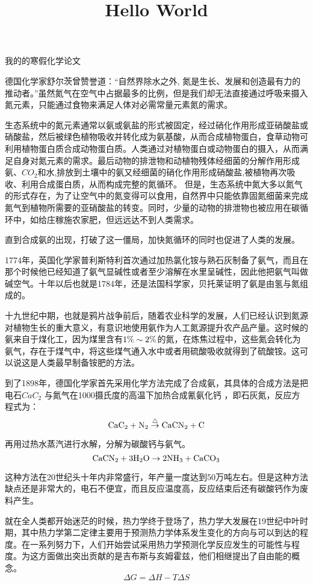 \documentclass{article}
\title{Hello World}
\begin{document}
  

我的的寒假化学论文

德国化学家舒尔茨曾赞誉道：“自然界除水之外, 氮是生长、发展和创造最有力的推动者。”虽然氮气在空气中占据最多的比例，但是我们却无法直接通过呼吸来摄入氮元素，只能通过食物来满足人体对必需常量元素氮的需求。

生态系统中的氮元素通常以氨或氨盐的形式被固定，经过硝化作用形成亚硝酸盐或硝酸盐，然后被绿色植物吸收并转化成为氨基酸，从而合成植物蛋白，食草动物可利用植物蛋白质合成动物蛋白质。人类通过对植物蛋白或动物蛋白的摄入，从而满足自身对氮元素的需求。最后动物的排泄物和动植物残体经细菌的分解作用形成氨、$CO_2$和水,排放到土壤中的氨又经细菌的硝化作用形成硝酸盐,被植物再次吸收、利用合成蛋白质，从而构成完整的氮循环。 但是，生态系统中氮大多以氮气的形式存在，为了让空气中的氮变得可以食用，自然界中只能依靠固氮细菌来完成氮气到植物所需要的亚硝酸盐的转变。同时，少量的动物的排泄物也被应用在碳循环中，如给庄稼施农家肥，但远远达不到人类需求。

直到合成氨的出现，打破了这一僵局，加快氮循环的同时也促进了人类的发展。

1774年，英国化学家普利斯特利首次通过加热氯化铵与熟石灰制备了氨气，而且在那个时候他已经知道了氨气显碱性或者至少溶解在水里呈碱性，因此他把氨气叫做碱空气。十年以后也就是1784年，还是法国科学家，贝托莱证明了氨是由氢与氮组成的。

十九世纪中期，也就是鸦片战争前后，随着农业科学的发展，人们已经认识到氮源对植物生长的重大意义，有意识地使用氨作为人工氮源提升农产品产量。这时候的氨来自于煤化工，因为煤里含有$\rm 1\%\sim2\%$的氮，在炼焦过程中，这些氮会转化为氨气，存在于煤气中，将这些煤气通入水中或者用硫酸吸收就得到了硫酸铵。这可以说这是人类最早制备铵肥的方法。

到了1898年，德国化学家首先采用化学方法完成了合成氨，其具体的合成方法是把电石$CaC_2$ 与氮气在1000摄氏度的高温下加热合成氰氨化钙  ，即石灰氮，反应方程式为：
$$
\rm CaC_2 + N_2\overset{\triangle }{\rightarrow}  CaCN_2 + C
$$

再用过热水蒸汽进行水解，分解为碳酸钙与氨气。
$$
\rm CaCN_2+3H_2O \rightarrow2NH_3+CaCO_3
$$

这种方法在20世纪头十年内非常盛行，年产量一度达到50万吨左右。但是这种方法缺点还是非常大的，电石不便宜，而且反应温度高，反应结束后还有碳酸钙作为废料产生。

就在全人类都开始迷茫的时候，热力学终于登场了，热力学大发展在19世纪中叶时期，其中热力学第二定律主要用于预测热力学体系发生变化的方向与可以到达的程度。在一系列努力下，人们开始尝试采用热力学预测化学反应发生的可能性与程度。为这方面做出突出贡献的是吉布斯与亥姆霍兹，他们相继提出了自由能的概念。
$$
\Delta G=\Delta H-T\Delta S
$$
\end{document}
